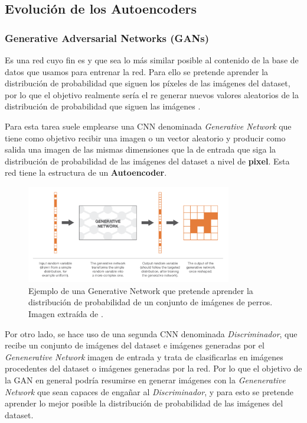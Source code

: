     \subsection{Evolución de los Autoencoders}
        \subsubsection{Generative Adversarial Networks (GANs)}
            \noindent Es una red cuyo fin es  y que sea lo más similar posible al contenido de la base de datos que usamos para entrenar la red. Para ello se pretende aprender la distribución de probabilidad que siguen los píxeles de las imágenes del dataset, por lo que el objetivo realmente sería el re generar nuevos valores aleatorios de la distribución de probabilidad que siguen las imágenes \cite{GAN}. 

            \medskip

            \noindent Para esta tarea suele emplearse una CNN denominada \textit{Generative Network} que tiene como objetivo recibir una imagen o un vector aleatorio y producir como salida una imagen de las mismas dimensiones que la de entrada que siga la distribución de probabilidad de las imágenes del dataset a nivel de \textbf{pixel}. Esta red tiene la estructura de un \textbf{Autoencoder}.

            \begin{figure}[!h]
                \centering
                \includegraphics[width=0.8\textwidth]{img/Generative_network.png}
                \caption{Ejemplo de una Generative Network que pretende aprender la distribución de probabilidad de un conjunto de imágenes de perros. Imagen extraída de \cite{autoencoders2017}.}
                \label{fig:Generative Network}
            \end{figure}
            
            \medskip

            \noindent Por otro lado, se hace uso de una segunda CNN denominada \textit{Discriminador}, que recibe un conjunto de imágenes del dataset e imágenes generadas por el \textit{Genenerative Network} imagen de entrada y trata de clasificarlas en imágenes procedentes del dataset o imágenes generadas por la red. Por lo que el objetivo de la GAN en general podría resumirse en generar imágenes con la \textit{Genenerative Network} que sean capaces de engañar al \textit{Discriminador}, y para esto se pretende aprender lo mejor posible la distribución de probabilidad de las imágenes del dataset.

